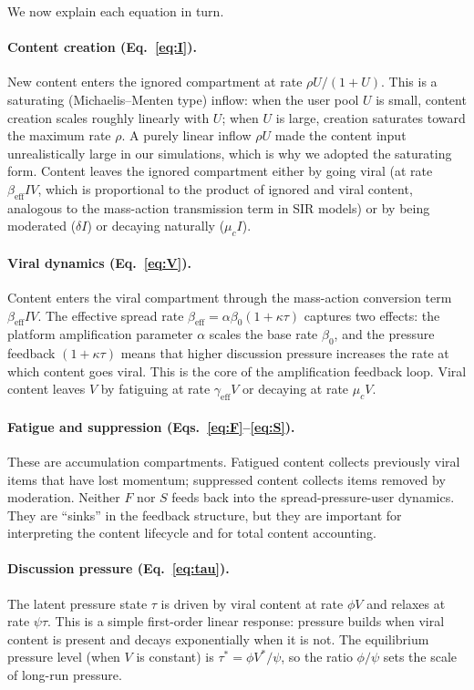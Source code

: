 \documentclass[11pt]{article}
\begin{document}
We now explain each equation in turn.

\paragraph{Content creation (Eq.~\ref{eq:I}).} New content enters the ignored compartment at rate $\rho U / (1+U)$. This is a saturating (Michaelis--Menten type) inflow: when the user pool $U$ is small, content creation scales roughly linearly with $U$; when $U$ is large, creation saturates toward the maximum rate $\rho$. A purely linear inflow $\rho U$ made the content input unrealistically large in our simulations, which is why we adopted the saturating form. Content leaves the ignored compartment either by going viral (at rate $\beta_{\mathrm{eff}} I V$, which is proportional to the product of ignored and viral content, analogous to the mass-action transmission term in SIR models) or by being moderated ($\delta I$) or decaying naturally ($\mu_c I$).

\paragraph{Viral dynamics (Eq.~\ref{eq:V}).} Content enters the viral compartment through the mass-action conversion term $\beta_{\mathrm{eff}} I V$. The effective spread rate $\beta_{\mathrm{eff}} = \alpha \beta_0 (1+\kappa\tau)$ captures two effects: the platform amplification parameter $\alpha$ scales the base rate $\beta_0$, and the pressure feedback $(1+\kappa\tau)$ means that higher discussion pressure increases the rate at which content goes viral. This is the core of the amplification feedback loop. Viral content leaves $V$ by fatiguing at rate $\gamma_{\mathrm{eff}} V$ or decaying at rate $\mu_c V$.

\paragraph{Fatigue and suppression (Eqs.~\ref{eq:F}--\ref{eq:S}).} These are accumulation compartments. Fatigued content collects previously viral items that have lost momentum; suppressed content collects items removed by moderation. Neither $F$ nor $S$ feeds back into the spread-pressure-user dynamics. They are ``sinks'' in the feedback structure, but they are important for interpreting the content lifecycle and for total content accounting.

\paragraph{Discussion pressure (Eq.~\ref{eq:tau}).} The latent pressure state $\tau$ is driven by viral content at rate $\phi V$ and relaxes at rate $\psi\tau$. This is a simple first-order linear response: pressure builds when viral content is present and decays exponentially when it is not. The equilibrium pressure level (when $V$ is constant) is $\tau^* = \phi V^* / \psi$, so the ratio $\phi/\psi$ sets the scale of long-run pressure.
\end{document}
